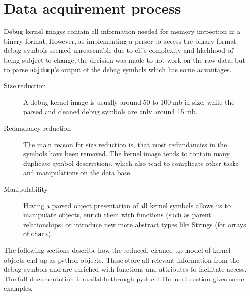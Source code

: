 \section{Data acquirement process}
Debug kernel images contain all information needed for memory inspection in a binary format. However, as implementing a parser to access the binary format debug symbols seemed unreasonable due to elf’s complexity and likelihood of being subject to change, the decision was made to not work on the raw data, but to parse \texttt{objdump}’s output of the debug symbols which has some advantages.

\begin{description}
	\item[Size reduction] A debug kernel image is usually around 50 to 100 mb in size, while the parsed and cleaned debug symbols are only around 15 mb.
	\item[Redundancy reduction] The main reason for size reduction is, that most redundancies in the symbols have been removed. The kernel image tends to contain many duplicate symbol descriptions, which also tend to complicate other tasks and manipulations on the data base.
	\item[Manipulability] Having a parsed object presentation of all kernel symbols allows us to manipulate objects, enrich them with functions (such as parent relationships) or introduce new more abstract types like Strings (for arrays of \texttt{chars}).
\end{description}

The following sections describe how the reduced, cleaned-up model of kernel objects end up as python objects.
These store all relevant information from the debug symbols and are enriched with functions and attributes to facilitate access.
The full documentation is available through pydoc.TThe next section gives some examples.

